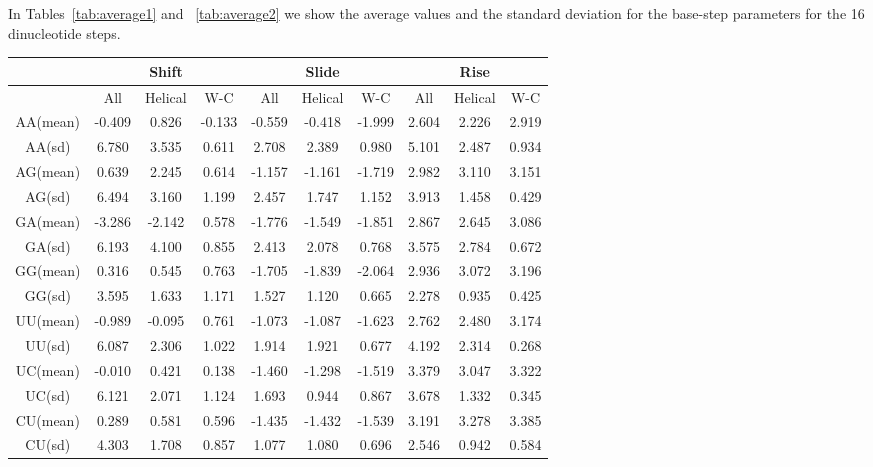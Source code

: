 In Tables~\ref{tab:average1} and ~\ref{tab:average2} we show the average values and
the standard deviation for the base-step parameters for the 16
dinucleotide steps.


\begin{table}[htbp]
\begin{center}
{\small
\begin{tabular}{|c|c|c|c|c|c|c|c|c|c|}
\hline
 & \multicolumn{3}{|c|}{Shift} 
 & \multicolumn{3}{|c|}{Slide} 
 & \multicolumn{3}{|c|}{Rise} \\ \hline
 & All & Helical & W-C & All & Helical & W-C &
   All & Helical & W-C \\ \hline
AA(mean) &-0.409 & 0.826 & -0.133 & -0.559 & -0.418 & -1.999 & 2.604 & 2.226 & 2.919 \\ \hline
AA(sd)  & 6.780 & 3.535 & 0.611 & 2.708 & 2.389 & 0.980 & 5.101 & 2.487 & 0.934 \\ \hline     
AG(mean) &0.639 & 2.245 & 0.614 & -1.157 & -1.161 & -1.719 & 2.982 & 3.110 & 3.151 \\ \hline  
AG(sd)  & 6.494 & 3.160 & 1.199 & 2.457 & 1.747 & 1.152 & 3.913 & 1.458 & 0.429 \\ \hline     
GA(mean) &-3.286 & -2.142 & 0.578 & -1.776 & -1.549 & -1.851 & 2.867 & 2.645 & 3.086 \\ \hline
GA(sd)  & 6.193 & 4.100 & 0.855 & 2.413 & 2.078 & 0.768 & 3.575 & 2.784 & 0.672 \\ \hline     
GG(mean) &0.316 & 0.545 & 0.763 & -1.705 & -1.839 & -2.064 & 2.936 & 3.072 & 3.196 \\ \hline  
GG(sd)  & 3.595 & 1.633 & 1.171 & 1.527 & 1.120 & 0.665 & 2.278 & 0.935 & 0.425 \\ \hline     
UU(mean) &-0.989 & -0.095 & 0.761 & -1.073 & -1.087 & -1.623 & 2.762 & 2.480 & 3.174 \\ \hline
UU(sd)  & 6.087 & 2.306 & 1.022 & 1.914 & 1.921 & 0.677 & 4.192 & 2.314 & 0.268 \\ \hline     
UC(mean) &-0.010 & 0.421 & 0.138 & -1.460 & -1.298 & -1.519 & 3.379 & 3.047 & 3.322 \\ \hline 
UC(sd)  & 6.121 & 2.071 & 1.124 & 1.693 & 0.944 & 0.867 & 3.678 & 1.332 & 0.345 \\ \hline     
CU(mean) &0.289 & 0.581 & 0.596 & -1.435 & -1.432 & -1.539 & 3.191 & 3.278 & 3.385 \\ \hline  
CU(sd)  & 4.303 & 1.708 & 0.857 & 1.077 & 1.080 & 0.696 & 2.546 & 0.942 & 0.584 \\ \hline     

\end{tabular}}
\end{center}
\end{table}
